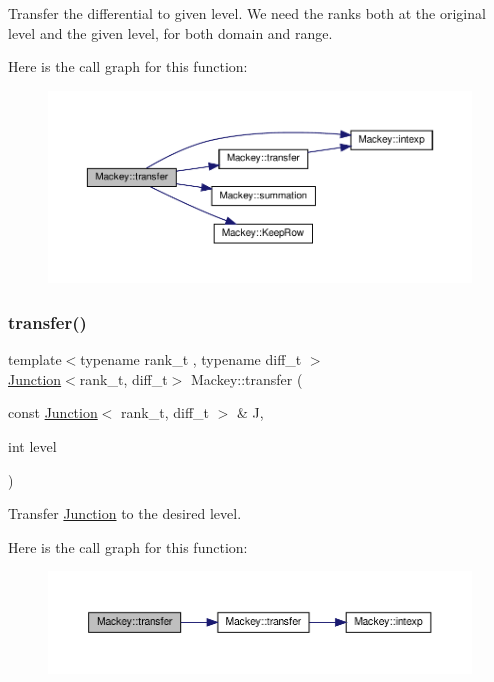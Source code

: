 Transfer the differential to given level. We need the ranks both at the original level and the given level, for both domain and range. 

Here is the call graph for this function\+:\nopagebreak
\begin{figure}[H]
\begin{center}
\leavevmode
\includegraphics[width=350pt]{namespaceMackey_ad7524839b58c80d4b2c54827e4833b12_cgraph}
\end{center}
\end{figure}
\mbox{\label{namespaceMackey_a914aba7f868e67ae3fd9da3995678660}} 
\subsubsection{\texorpdfstring{transfer()}{transfer()}\hspace{0.1cm}{\footnotesize\ttfamily [3/5]}}
{\footnotesize\ttfamily template$<$typename rank\+\_\+t , typename diff\+\_\+t $>$ \\
\hyperlink{classMackey_1_1Junction}{Junction}$<$rank\+\_\+t, diff\+\_\+t$>$ Mackey\+::transfer (\begin{DoxyParamCaption}\item[{const \hyperlink{classMackey_1_1Junction}{Junction}$<$ rank\+\_\+t, diff\+\_\+t $>$ \&}]{J,  }\item[{int}]{level }\end{DoxyParamCaption})}



Transfer \hyperlink{classMackey_1_1Junction}{Junction} to the desired level. 

Here is the call graph for this function\+:\nopagebreak
\begin{figure}[H]
\begin{center}
\leavevmode
\includegraphics[width=350pt]{namespaceMackey_a914aba7f868e67ae3fd9da3995678660_cgraph}
\end{center}
\end{figure}
\mbox{\label{namespaceMackey_a50837580391b5c6705e23c637d742b22}} 
